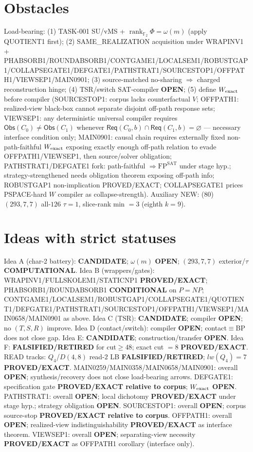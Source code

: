 \documentclass[11pt]{article}
\begin{document}
\section*{Obstacles}
Load-bearing: (1) TASK-001 SU/vMS + $\operatorname{rank}_{\mathbb F_2}\Phi=\omega(m)$ (apply QUOTIENT1 first);
(2) SAME\_REALIZATION acquisition under WRAPINV1 + PHABSORB1/ROUNDABSORB1/CONTGAME1/LOCALSEM1/ROBUSTGAP1/COLLAPSEGATE1/DEFGATE1/PATHSTRAT1/SOURCESTOP1/OFFPATH1/VIEWSEP1/MAIN0901;
(3) source-matched no-sharing $\Rightarrow$ charged reconstruction hinge;
(4) TSR/switch SAT-compiler \textbf{OPEN};
(5) define $W_{\rm exact}$ before compiler (SOURCESTOP1: corpus lacks counterfactual $V$;
OFFPATH1: realized-view black-box cannot separate disjoint off-path response sets;
VIEWSEP1: any deterministic universal compiler requires $\mathsf{Obs}(C_0)\ne\mathsf{Obs}(C_1)$
whenever $\mathsf{Req}(C_0,b)\cap\mathsf{Req}(C_1,b)=\varnothing$ --- necessary interface condition only;
MAIN0901: causal chain requires externally fixed non-path-faithful $W_{\rm exact}$ exposing
exactly enough off-path relation to evade OFFPATH1/VIEWSEP1, then source/solver obligation;
PATHSTRAT1/DEFGATE1 fork: path-faithful $\Rightarrow\mathrm{FP}^{\mathrm{SAT}}$ under stage hyp.;
strategy-strengthened needs obligation theorem exposing off-path info;
ROBUSTGAP1 non-implication PROVED/EXACT; COLLAPSEGATE1 prices PSPACE-hard $W$ compiler as collapse-strength).
Auxiliary NEW: (80) $(293,7,7)$ all-$126$ $\tau{=}1$, slice-rank min $=3$ (eighth $k{=}9$).

\section*{Ideas with strict statuses}
Idea A (char-2 battery): \textbf{CANDIDATE}; $\omega(m)$ \textbf{OPEN}; $(293,7,7)$ exterior/$\tau$ \textbf{COMPUTATIONAL}.
Idea B (wrappers/gates): WRAPINV1/FULLSKOLEM1/STATICNP1 \textbf{PROVED/EXACT};
PHABSORB1/ROUNDABSORB1 \textbf{CONDITIONAL} on $P=NP$;
CONTGAME1/LOCALSEM1/ROBUSTGAP1/COLLAPSEGATE1/QUOTIENT1/DEFGATE1/PATHSTRAT1/SOURCESTOP1/OFFPATH1/VIEWSEP1/MAIN0658/MAIN0901 as above.
Idea C (TSR): \textbf{CANDIDATE}; compiler \textbf{OPEN}; no $(T,S,R)$ improve.
Idea D (contact/switch): compiler \textbf{OPEN}; contact$\equiv$BP does not close gap.
Idea E: \textbf{CANDIDATE}; construction/transfer \textbf{OPEN}.
Idea F: \textbf{FALSIFIED/RETIRED} for cut$\ge48$; exact cut $=8$ \textbf{PROVED/EXACT}.
READ tracks: $Q_4$/$D(4,8)$ read-$2$ LB \textbf{FALSIFIED/RETIRED}; $lw(Q_4)=7$ \textbf{PROVED/EXACT}.
MAIN0259/MAIN0358/MAIN0658/MAIN0901: overall \textbf{OPEN}; synthesis/recovery does not close load-bearing arrows.
DEFGATE1: specification gate \textbf{PROVED/EXACT relative to corpus}; $W_{\rm exact}$ \textbf{OPEN}.
PATHSTRAT1: overall \textbf{OPEN}; local dichotomy \textbf{PROVED/EXACT} under stage hyp.; strategy obligation \textbf{OPEN}.
SOURCESTOP1: overall \textbf{OPEN}; corpus source-stop \textbf{PROVED/EXACT relative to corpus}.
OFFPATH1: overall \textbf{OPEN}; realized-view indistinguishability \textbf{PROVED/EXACT} as interface theorem.
VIEWSEP1: overall \textbf{OPEN}; separating-view necessity \textbf{PROVED/EXACT} as OFFPATH1 corollary (interface only).
\end{document}
